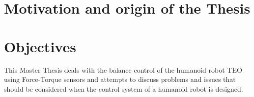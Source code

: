 
\section{Motivation and origin of the Thesis}

\section{Objectives}
This Master Thesis deals with the balance control of the humanoid robot TEO using Force-Torque sensors and attempts to discuss problems and issues that should be considered when the control system of a humanoid robot is designed. 

